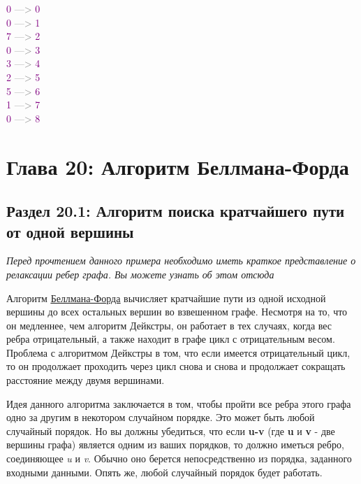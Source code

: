 \begin{tcolorbox}
{    \textcolor{Purple}{0} \textcolor{Gray}{--->} \textcolor{Purple}{0} \\
    \textcolor{Purple}{0} \textcolor{Gray}{--->} \textcolor{Purple}{1} \\
    \textcolor{Purple}{7} \textcolor{Gray}{--->} \textcolor{Purple}{2} \\
    \textcolor{Purple}{0} \textcolor{Gray}{--->} \textcolor{Purple}{3} \\
    \textcolor{Purple}{3} \textcolor{Gray}{--->} \textcolor{Purple}{4} \\
    \textcolor{Purple}{2} \textcolor{Gray}{--->} \textcolor{Purple}{5} \\
    \textcolor{Purple}{5} \textcolor{Gray}{--->} \textcolor{Purple}{6} \\
    \textcolor{Purple}{1} \textcolor{Gray}{--->} \textcolor{Purple}{7} \\
    \textcolor{Purple}{0} \textcolor{Gray}{--->} \textcolor{Purple}{8} \\
    }
\end{tcolorbox}

\chapter*{Глава 20: Алгоритм Беллмана-Форда}
\section*{Раздел 20.1: Алгоритм поиска кратчайшего пути от одной вершины }

\textit{Перед прочтением данного примера необходимо иметь краткое представление о релаксации ребер графа. Вы можете узнать об этом отсюда}

\vspace{\baselineskip}

Алгоритм \href{https://vk.cc/6DZOvo}{\underline{Беллмана-Форда}} вычисляет кратчайшие пути из одной исходной вершины до всех остальных вершин во взвешенном графе. Несмотря на то, что он медленнее, чем алгоритм Дейкстры, он работает в тех случаях, когда вес ребра отрицательный, а также находит в графе цикл с отрицательным весом. Проблема с алгоритмом Дейкстры в том, что если имеется отрицательный цикл, то он продолжает проходить через цикл снова и снова и продолжает сокращать расстояние между двумя вершинами.

\vspace{\baselineskip}

Идея данного алгоритма заключается в том, чтобы пройти все ребра этого графа одно за другим в некотором случайном порядке. Это может быть любой случайный порядок. Но вы должны убедиться, что если \textbf{u-v} (где \textbf{u} и \textbf{v} - две вершины графа) является одним из ваших порядков, то должно иметься ребро, соединяющее \textit{u} и \textit{v}. Обычно оно берется непосредственно из порядка, заданного входными данными. Опять же, любой случайный порядок будет работать.

